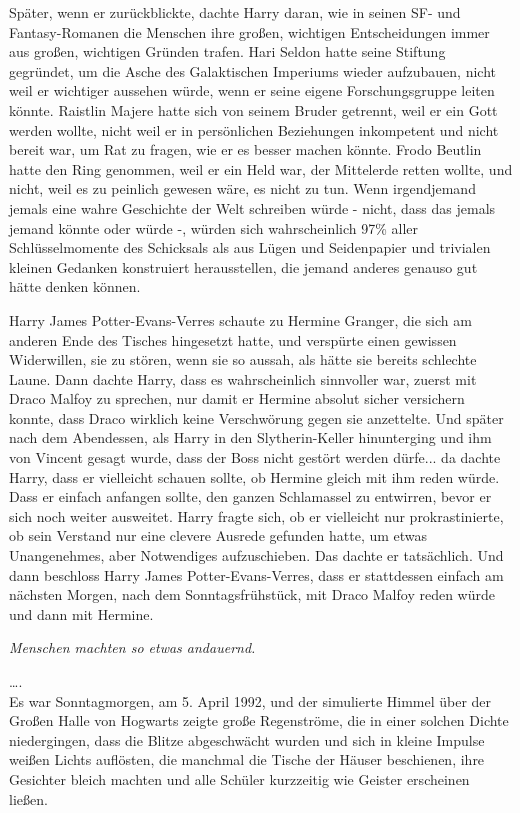 {Später, wenn er zurückblickte, dachte Harry daran, wie in seinen SF- und Fantasy-Romanen die Menschen ihre großen, wichtigen Entscheidungen immer aus großen, wichtigen Gründen trafen. Hari Seldon hatte seine Stiftung gegründet, um die Asche des Galaktischen Imperiums wieder aufzubauen, nicht weil er wichtiger aussehen würde, wenn er seine eigene Forschungsgruppe leiten könnte. Raistlin Majere hatte sich von seinem Bruder getrennt, weil er ein Gott werden wollte, nicht weil er in persönlichen Beziehungen inkompetent und nicht bereit war, um Rat zu fragen, wie er es besser machen könnte. Frodo Beutlin hatte den Ring genommen, weil er ein Held war, der Mittelerde retten wollte, und nicht, weil es zu peinlich gewesen wäre, es nicht zu tun. Wenn irgendjemand jemals eine wahre Geschichte der Welt schreiben würde - nicht, dass das jemals jemand könnte oder würde -, würden sich wahrscheinlich 97\% aller Schlüsselmomente des Schicksals als aus Lügen und Seidenpapier und trivialen kleinen Gedanken konstruiert herausstellen, die jemand anderes genauso gut hätte denken können.

Harry James Potter-Evans-Verres schaute zu Hermine Granger, die sich am anderen Ende des Tisches hingesetzt hatte, und verspürte einen gewissen Widerwillen, sie zu stören, wenn sie so aussah, als hätte sie bereits schlechte Laune. Dann dachte Harry, dass es wahrscheinlich sinnvoller war, zuerst mit Draco Malfoy zu sprechen, nur damit er Hermine absolut sicher versichern konnte, dass Draco wirklich keine Verschwörung gegen sie anzettelte. Und später nach dem Abendessen, als Harry in den Slytherin-Keller hinunterging und ihm von Vincent gesagt wurde, dass der Boss nicht gestört werden dürfe... da dachte Harry, dass er vielleicht schauen sollte, ob Hermine gleich mit ihm reden würde. Dass er einfach anfangen sollte, den ganzen Schlamassel zu entwirren, bevor er sich noch weiter ausweitet. Harry fragte sich, ob er vielleicht nur prokrastinierte, ob sein Verstand nur eine clevere Ausrede gefunden hatte, um etwas Unangenehmes, aber Notwendiges aufzuschieben. Das dachte er tatsächlich. Und dann beschloss Harry James Potter-Evans-Verres, dass er stattdessen einfach am nächsten Morgen, nach dem Sonntagsfrühstück, mit Draco Malfoy reden würde und dann mit Hermine.

\emph{Menschen machten so etwas andauernd.}

….\\ Es war Sonntagmorgen, am 5. April 1992, und der simulierte Himmel über der Großen Halle von Hogwarts zeigte große Regenströme, die in einer solchen Dichte niedergingen, dass die Blitze abgeschwächt wurden und sich in kleine Impulse weißen Lichts auflösten, die manchmal die Tische der Häuser beschienen, ihre Gesichter bleich machten und alle Schüler kurzzeitig wie Geister erscheinen ließen.

}
